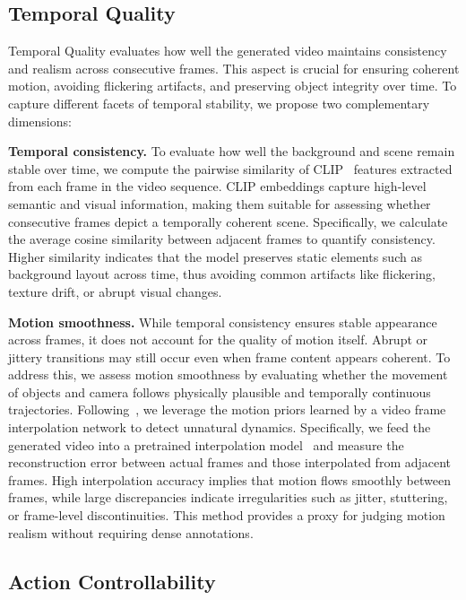 \documentclass{article}
\begin{document}
 

\subsection{Temporal Quality}
\label{subsec:temporal_quality}

Temporal Quality evaluates how well the generated video maintains consistency and realism across consecutive frames. This aspect is crucial for ensuring coherent motion, avoiding flickering artifacts, and preserving object integrity over time. To capture different facets of temporal stability, we propose two complementary dimensions:

\noindent\textbf{{Temporal consistency.}  }
To evaluate how well the background and scene remain stable over time, we compute the pairwise similarity of CLIP~\cite{radford2021clip} features extracted from each frame in the video sequence. CLIP embeddings capture high-level semantic and visual information, making them suitable for assessing whether consecutive frames depict a temporally coherent scene. Specifically, we calculate the average cosine similarity between adjacent frames to quantify consistency. Higher similarity indicates that the model preserves static elements such as background layout across time, thus avoiding common artifacts like flickering, texture drift, or abrupt visual changes.
   

\noindent\textbf{{Motion smoothness.}  }
While temporal consistency ensures stable appearance across frames, it does not account for the quality of motion itself. Abrupt or jittery transitions may still occur even when frame content appears coherent. To address this, we assess motion smoothness by evaluating whether the movement of objects and camera follows physically plausible and temporally continuous trajectories. Following~\cite{licvpr23amt}, we leverage the motion priors learned by a video frame interpolation network to detect unnatural dynamics. Specifically, we feed the generated video into a pretrained interpolation model~\cite{licvpr23amt} and measure the reconstruction error between actual frames and those interpolated from adjacent frames. High interpolation accuracy implies that motion flows smoothly between frames, while large discrepancies indicate irregularities such as jitter, stuttering, or frame-level discontinuities. This method provides a proxy for judging motion realism without requiring dense annotations.  

\subsection{Action Controllability}
\end{document}
